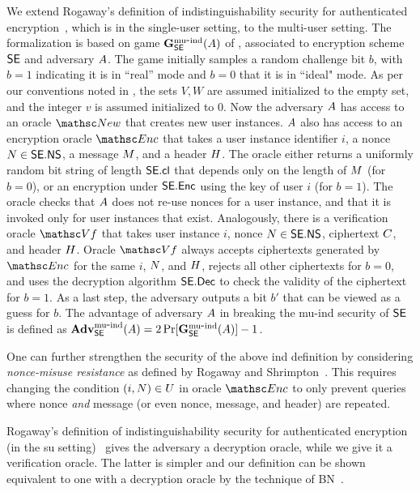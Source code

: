 
We extend Rogaway's definition of  indistinguishability security for authenticated encryption~\cite{CCS:Rogaway02}, which is in the single-user setting, to the multi-user setting. The formalization is based on game $\mathbf{G}^{\rm mu\mbox{-}ind}_{\mathsf{SE}}(A)$ of , associated to encryption scheme $\mathsf{SE}$ and adversary $A$. The game initially samples a random challenge bit $b$, with $b=1$ indicating it is in ``real'' mode and $b=0$ that it is in ``ideal" mode. As per our conventions noted in ,  the sets $V,W$ are assumed initialized to the empty set, and the integer $v$ is assumed initialized to $0$. Now the adversary $A$ has access to an oracle $\NewO$ that creates new user instances. $A$ also has access to an encryption oracle $\EncO$ that takes a user instance identifier $i$, a nonce $N \in \mathsf{SE}.\mathsf{NS}$, a message $M$, and a header $H$. The oracle either returns a uniformly random bit string of length $\mathsf{SE}.\mathsf{cl}$ that depends only on the length of $M$ (for $b=0$), or an encryption under $\mathsf{SE}.\mathsf{Enc}$ using the key of user $i$  (for $b=1$). The oracle checks that $A$ does not re-use nonces for a user instance, and that it is invoked only for user instances that exist. Analogously, there is a verification oracle $\VfO$ that takes user instance $i$, nonce $N \in \mathsf{SE}.\mathsf{NS}$, ciphertext $C$, and header $H$. Oracle $\VfO$ always accepts ciphertexts generated by $\EncO$ for the same  $i$, $N$, and $H$, rejects all other ciphertexts for $b=0$, and uses the decryption algorithm $\mathsf{SE}.\mathsf{Dec}$ to check the validity of the ciphertext for $b=1$.  As a last step, the adversary outputs a bit $b'$ that can be viewed as a guess for $b$.  The advantage of adversary $A$ in breaking the mu-ind security of   $\mathsf{SE}$ is defined as $\mathbf{Adv}^{\rm mu\mbox{-}ind}_{\mathsf{SE}}(A) = 2\Pr[\mathbf{G}^{\rm mu\mbox{-}ind}_{\mathsf{SE}}(A)]- 1$.

One can further strengthen the security of the above ind definition by considering \emph{nonce-misuse resistance} as defined by Rogaway and Shrimpton~\cite{EC:RogShr06}. This requires changing the condition $(i,N)\in U$ in oracle $\EncO$ to only prevent queries where nonce \emph{and} message (or even nonce, message, and header) are repeated. 

Rogaway's definition of indistinguishability security for authenticated encryption (in the su setting)~\cite{CCS:Rogaway02} gives the adversary a decryption oracle, while we give it a verification oracle. The latter is simpler and our definition can be shown equivalent to one with a decryption oracle by the technique of BN~\cite{AC:BelNam00}.

